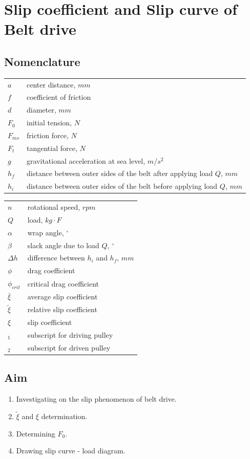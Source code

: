 \chapter{Slip coefficient and Slip curve of Belt drive}
\section{Nomenclature}
\begin{tabular}[t]{lp{7cm}}
	$ a $ & center distance, $ mm $\\
	$ f $ & coefficient of friction\\
	$ d $ & diameter, $ mm $\\
	$ F_0 $ & initial tension, $ N $\\
	$ F_{ms} $ & friction force, $ N $\\
	$ F_t $ & tangential force, $ N $\\ 
	$ g $ & gravitational acceleration at sea level, $ m/s^2 $\\
	$ h_f $ & distance between outer sides of the belt after applying load $ Q $, $ mm $\\
	$ h_i $ & distance between outer sides of the belt before applying load $ Q $, $ mm $\\	
\end{tabular}
\begin{tabular}[t]{lp{7cm}}
	$ n $ & rotational speed, $ rpm $\\
	$ Q $ & load, $ kg\cdot F $\\
	$ \alpha $ & wrap angle, $ ^{\circ} $\\
	$ \beta $ & slack angle due to load $ Q $, $ \unit{^{\circ}} $\\
	$ \Delta h $ & difference between $ h_i $ and $ h_f $, $ \unit{mm} $\\
	$ \phi $ & drag coefficient\\
	$ \phi_{crit} $ & critical drag coefficient\\
	$ \bar{\xi} $ & average slip coefficient\\
	$ \tilde{\xi} $ & relative slip coefficient\\
	$ \xi $ & slip coefficient\\	
	$ _1 $ & subscript for driving pulley\\
	$ _2 $ & subscript for driven pulley\\
\end{tabular}
\section{Aim}
\begin{enumerate}
	\item Investigating on the slip phenomenon of belt drive.
	\item $ \tilde{\xi} $ and $ \xi $ determination.
	\item Determining $ F_0 $.
	\item Drawing slip curve - load diagram.
\end{enumerate}

